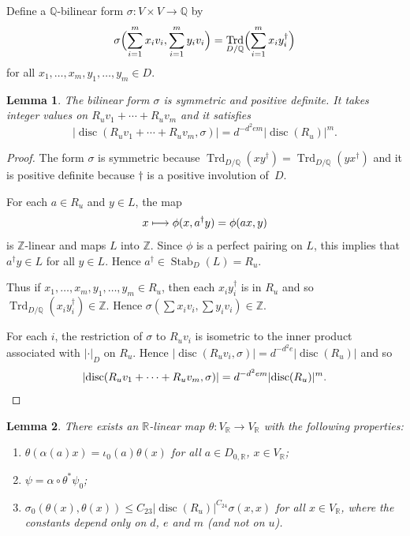 \documentclass[JEP,XML,SOM,Unicode,NoFloatCountersInSection]{cedram}
\newenvironment{enumeratei}
{\bgroup\def\theenumi{\roman{enumi}}\def\theenumii{\alph{enumii}}\begin{enumerate}}
{\end{enumerate}\egroup}
\def\mto{\mathchoice{\longmapsto}{\mapsto}{\mapsto}{\mapsto}}
\newcommand{\bQ}{\mathbb{Q}}
\newcommand{\bR}{\mathbb{R}}
\newcommand{\bZ}{\mathbb{Z}}
\DeclareMathOperator{\disc}{disc}
\DeclareMathOperator{\Stab}{Stab}
\DeclareMathOperator{\Trd}{Trd}
\newcommand{\abs}[1]{\lvert #1 \rvert}
\newtheorem{lemma}{Lemma}[section]
\begin{document}
Define a $\bQ$-bilinear form $\sigma \colon V \times V \to \bQ$ by
\[
\sigma \Bigl( \sum_{i=1}^m x_i v_i, \sum_{i=1}^m y_i v_i \Bigr) = \Trd_{D/\bQ} \Bigl(\sum_{i=1}^m x_i y_i^\dag\Bigr)
\]
for all $x_1, \dotsc, x_m, y_1, \dotsc, y_m \in D$.

\begin{lemma} \label{sigma-integral}
The bilinear form $\sigma$ is symmetric and positive definite.
It takes integer values on $R_uv_1 + \dotsb + R_uv_m$ and it satisfies
\[
\abs{\disc(R_uv_1 + \dotsb + R_uv_m, \sigma)} = d^{-d^2em} \abs{\disc(R_u)}^m.
\]
\end{lemma}

\begin{proof}
The form $\sigma$ is symmetric because $\Trd_{D/\bQ}(xy^\dag) = \Trd_{D/\bQ}(yx^\dag)$ and it is positive definite because $\dag$ is a positive involution of~$D$.

For each $a \in R_u$ and $y \in L$, the map
\[
x \mto \phi(x, a^\dag y) = \phi(ax, y)
\]
is $\bZ$-linear and maps $L$ into $\bZ$.
Since $\phi$ is a perfect pairing on $L$, this implies that $a^\dag y \in L$ for all $y \in L$.
Hence $a^\dag \in \Stab_D(L) = R_u$.

Thus if $x_1, \dotsc, x_m, y_1, \dotsc, y_m \!\in\! R_u$, then each $x_iy_i^\dag$ is in $R_u$ and so \hbox{$\Trd_{D/\bQ}(x_iy_i^\dag) \!\in\! \bZ$}.
Hence $\sigma(\sum x_i v_i, \sum y_i v_i) \in \bZ$.

For each $i$, the restriction of $\sigma$ to $R_uv_i$ is isometric to the inner product associated with $\abs{\cdot}_D$ on $R_u$.
Hence $\abs{\disc(R_uv_i, \sigma)} = d^{-d^2e} \abs{\disc(R_u)}$ and so
\[
\abs{\disc(R_uv_1 + \dotsb + R_uv_m, \sigma)} = d^{-d^2em} \abs{\disc(R_u)}^m.
\qedhere
\]
\end{proof}

\begin{lemma} \label{theta-def}
There exists an $\bR$-linear map $\theta \colon V_\bR \to V_\bR$ with the following properties:
\begin{enumeratei}
\item\label{theta-defi} $\theta(\alpha(a)x) = \iota_0(a)\theta(x)$ for all $a \in D_{0,\bR}$, $x \in V_\bR$;
\item\label{theta-defii} $\psi = \alpha \circ \theta^* \psi_0$;
\item\label{theta-defiii} $\sigma_0(\theta(x), \theta(x)) \leq C_{23} \abs{\disc(R_u)}^{C_{24}} \sigma(x,x)$ for all $x \in V_\bR$, where the constants depend only on $d$, $e$ and $m$ (and not on $u$).
\end{enumeratei}
\end{lemma}
\end{document}
